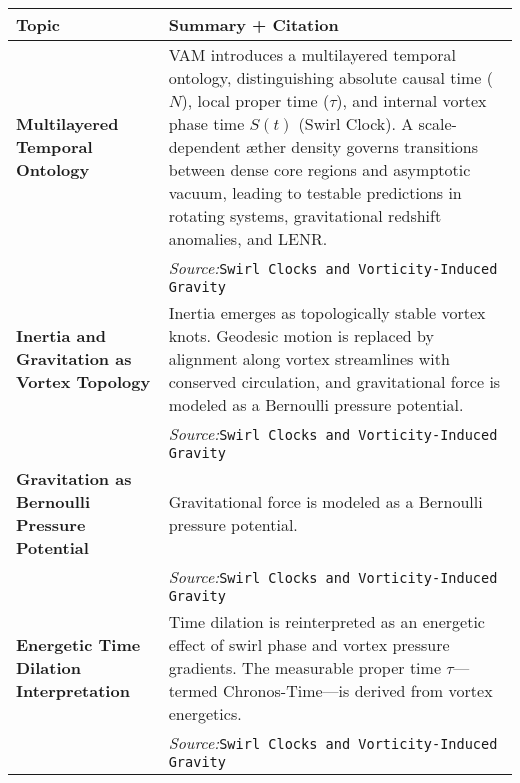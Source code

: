 \documentclass[11pt]{article}
\begin{document}
  \titlepageOpen

  \begin{abstract}


  \end{abstract}

  \titlepageClose
  \fi

  \ifdefined\standalonechapter
  \section{\papertitle}
  \else
  \fi



\begin{table}[H]
\centering
\begin{tabular}{|p{4.3cm}|p{9.5cm}|}
\hline
\textbf{Topic} & \textbf{Summary + Citation} \\
\hline
\textbf{Multilayered Temporal Ontology} &
VAM introduces a multilayered temporal ontology, distinguishing absolute causal time ($N$), local proper time ($\tau$), and internal vortex phase time $S(t)$ (Swirl Clock). A scale-dependent æther density governs transitions between dense core regions and asymptotic vacuum, leading to testable predictions in rotating systems, gravitational redshift anomalies, and LENR.\\
& \textit{Source:}\texttt{Swirl Clocks and Vorticity-Induced Gravity}\\
\hline

\textbf{Inertia and Gravitation as Vortex Topology} &
Inertia emerges as topologically stable vortex knots. Geodesic motion is replaced by alignment along vortex streamlines with conserved circulation, and gravitational force is modeled as a Bernoulli pressure potential.\\
& \textit{Source:}\texttt{Swirl Clocks and Vorticity-Induced Gravity}\\
\hline

\textbf{Gravitation as Bernoulli Pressure Potential} &
Gravitational force is modeled as a Bernoulli pressure potential.\\
& \textit{Source:}\texttt{Swirl Clocks and Vorticity-Induced Gravity}\\
\hline

\textbf{Energetic Time Dilation Interpretation} &
Time dilation is reinterpreted as an energetic effect of swirl phase and vortex pressure gradients. The measurable proper time $\tau$—termed Chronos-Time—is derived from vortex energetics.\\
& \textit{Source:}\texttt{Swirl Clocks and Vorticity-Induced Gravity}\\
\hline


\end{tabular}
\end{table}
\end{document}
